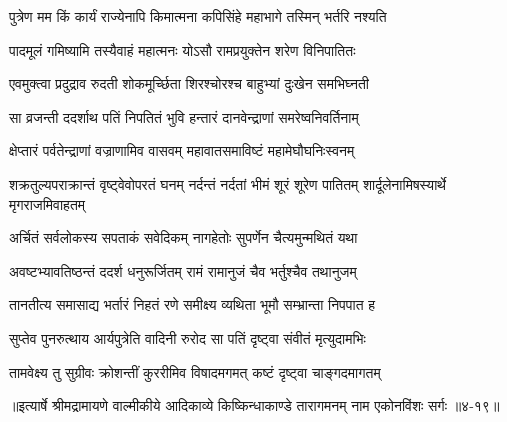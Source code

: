\twolineshloka
{पुत्रेण मम किं कार्यं राज्येनापि किमात्मना}
{कपिसिंहे महाभागे तस्मिन् भर्तरि नश्यति} %

\twolineshloka
{पादमूलं गमिष्यामि तस्यैवाहं महात्मनः}
{योऽसौ रामप्रयुक्तेन शरेण विनिपातितः} %

\twolineshloka
{एवमुक्त्वा प्रदुद्राव रुदती शोकमूर्च्छिता}
{शिरश्चोरश्च बाहुभ्यां दुःखेन समभिघ्नती} %

\twolineshloka
{सा व्रजन्ती ददर्शाथ पतिं निपतितं भुवि}
{हन्तारं दानवेन्द्राणां समरेष्वनिवर्तिनाम्} %

\twolineshloka
{क्षेप्तारं पर्वतेन्द्राणां वज्राणामिव वासवम्}
{महावातसमाविष्टं महामेघौघनिःस्वनम्} %

\threelineshloka
{शक्रतुल्यपराक्रान्तं वृष्ट्वेवोपरतं घनम्}
{नर्दन्तं नर्दतां भीमं शूरं शूरेण पातितम्}
{शार्दूलेनामिषस्यार्थे मृगराजमिवाहतम्} %

\twolineshloka
{अर्चितं सर्वलोकस्य सपताकं सवेदिकम्}
{नागहेतोः सुपर्णेन चैत्यमुन्मथितं यथा} %

\twolineshloka
{अवष्टभ्यावतिष्ठन्तं ददर्श धनुरूर्जितम्}
{रामं रामानुजं चैव भर्तुश्चैव तथानुजम्} %

\twolineshloka
{तानतीत्य समासाद्य भर्तारं निहतं रणे}
{समीक्ष्य व्यथिता भूमौ सम्भ्रान्ता निपपात ह} %

\twolineshloka
{सुप्तेव पुनरुत्थाय आर्यपुत्रेति वादिनी}
{रुरोद सा पतिं दृष्ट्वा संवीतं मृत्युदामभिः} %

\twolineshloka
{तामवेक्ष्य तु सुग्रीवः क्रोशन्तीं कुररीमिव}
{विषादमगमत् कष्टं दृष्ट्वा चाङ्गदमागतम्} %


॥इत्यार्षे श्रीमद्रामायणे वाल्मीकीये आदिकाव्ये किष्किन्धाकाण्डे तारागमनम् नाम एकोनविंशः सर्गः ॥४-१९॥
